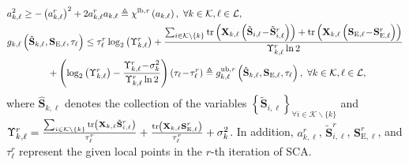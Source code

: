 \documentclass[12pt,draftclsnofoot, onecolumn]{IEEEtran}
\theoremstyle{plain}
\begin{document}
\begin{sloppypar}
\begin{align}
& a_{k,\ell}^2 \geq -\left( a_{k,\ell}^r\right)^2 + 2a_{k,\ell}^ra_{k,\ell} \triangleq \chi^{\rm lb, \it r}\left(a_{k,\ell}\right), \ \forall k\in\mathcal K, \ell\in\mathcal L, \label{express_a_lower}\\ 
& g_{k,\ell}\left(\hat{\mathbf S}_{k,\ell}, \mathbf S_{\mathrm E, \ell}, \tau_\ell\right)  \leq \tau_\ell^r\log_2\left(\Upsilon_{k,\ell}^r\right) + \frac{\sum_{i\in \mathcal K\backslash\{k\}}{\rm tr}\left(\mathbf X_{k,\ell}\left( \tilde{\mathbf S}_{i,\ell} \!-\! \tilde{\mathbf S}_{i,\ell}^r\right)\right) + {\rm tr}\left(\mathbf X_{k,\ell}\left( \mathbf S_{\mathrm E,\ell} \!-\! \mathbf S_{\mathrm E,\ell}^r\right) \right)}{\Upsilon_{k,\ell}^r\ln2} \nonumber\\
& \hspace{1.5cm} + \left(\log_2\left(\Upsilon_{k,\ell}^r\right) - \frac{\Upsilon_{k,\ell}^r \!-\! \sigma_k^2 }{\Upsilon_{k,\ell}^r\ln2}\right)\left(\tau_\ell \!-\! \tau_\ell^r\right) \triangleq g_{k,\ell}^{\rm ub, \it r}\left(\hat{\mathbf S}_{k,\ell}, \mathbf S_{\mathrm E, \ell}, \tau_\ell\right), \ \forall k\in\mathcal K, \ell\in\mathcal L, \label{express_g_upper}
\end{align}
where $\hat{\mathbf S}_{k,\ell}$ denotes the collection of the variables $\left\lbrace \tilde{\mathbf S}_{i,\ell}\right\rbrace_{\forall i\in\mathcal K\backslash\{k\}}$ and $\Upsilon_{k,\ell}^r = \frac{\sum_{i\in \mathcal K\backslash\{k\}}{\rm tr}\left(\mathbf X_{k,\ell}\tilde{\mathbf S}_{i,\ell}^r\right)}{\tau_\ell^r} + \frac{{\rm tr}\left(\mathbf X_{k,\ell}\mathbf S_{\mathrm E,\ell}^r\right)}{\tau_\ell^r} + \sigma_k^2$. In addition, $a_{k,\ell}^r$, $\tilde{\mathbf S}_{i,\ell}^r$, $\mathbf S_{\mathrm E,\ell}^r$, and $\tau_\ell^r$ represent the given local points in the $r$-th iteration of SCA. %


\end{sloppypar}
\end{document}
